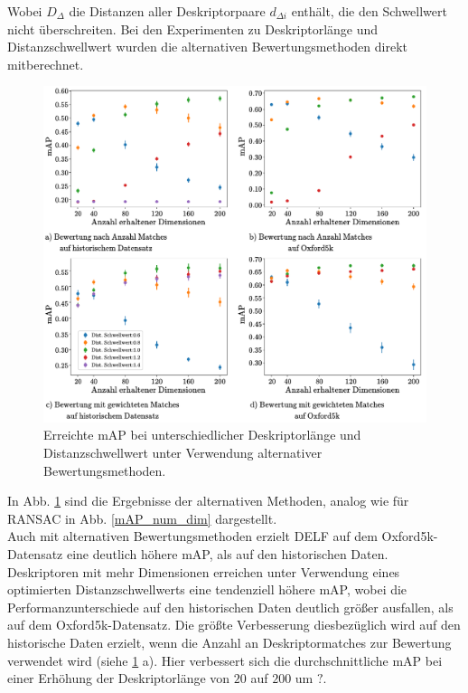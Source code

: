 Wobei $D_\Delta$ die Distanzen aller Deskriptorpaare $d_{\Delta i}$ enthält, die den Schwellwert nicht überschreiten.
Bei den Experimenten zu Deskriptorlänge und Distanzschwellwert wurden die alternativen Bewertungsmethoden direkt mitberechnet.
\begin{figure}[h]
\includegraphics[scale=0.74]{mAp_num_dim_scoring_methods}
\caption{Erreichte mAP bei unterschiedlicher Deskriptorlänge und Distanzschwellwert unter Verwendung alternativer Bewertungsmethoden.}
\label{mAP_num_dim_scoring_methods}
\end{figure}
In Abb. \ref{mAP_num_dim_scoring_methods} sind die Ergebnisse der alternativen Methoden, analog wie für RANSAC in Abb. \ref{mAP_num_dim} dargestellt.\\
Auch mit alternativen Bewertungsmethoden erzielt DELF auf dem Oxford5k-Datensatz eine deutlich höhere mAP, als auf den historischen Daten. 
Deskriptoren mit mehr Dimensionen erreichen unter Verwendung eines optimierten Distanzschwellwerts eine tendenziell höhere mAP, wobei die Performanzunterschiede auf den historischen Daten deutlich größer ausfallen, als auf dem Oxford5k-Datensatz. Die größte Verbesserung diesbezüglich wird auf den historische Daten erzielt, wenn die Anzahl an Deskriptormatches zur Bewertung verwendet wird (siehe \ref{mAP_num_dim_scoring_methods} a). Hier verbessert sich die durchschnittliche mAP bei einer Erhöhung der Deskriptorlänge von $20$ auf $200$  um $?$.\\
